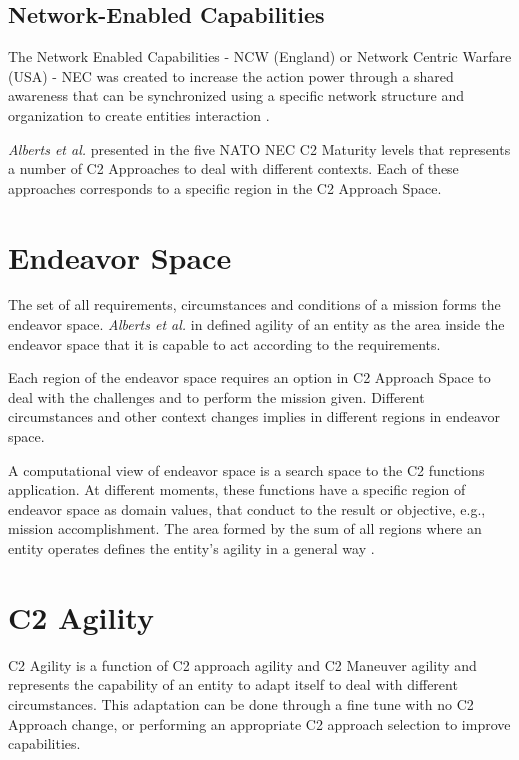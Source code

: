\subsection {Network-Enabled Capabilities}

The Network Enabled Capabilities - NCW (England) or Network Centric Warfare (USA) - NEC was created to increase the action power through a shared awareness that can be synchronized using a specific network structure and organization to create entities interaction \cite{Alberts2000}. 

\textit{Alberts et al.} presented in \cite{nato01} the five NATO NEC C2 Maturity levels that represents a number of C2 Approaches to deal with different contexts. Each of these approaches corresponds to a specific region in the C2 Approach Space.




\section{Endeavor Space}

The set of all requirements, circumstances and conditions of a mission forms the endeavor space. \textit{Alberts et al.} in  \cite{Alberts2011} defined agility of an entity as the area inside the endeavor space that it is capable to act according to the requirements.

Each region of the endeavor space requires an option in C2 Approach Space to deal with the challenges and to perform the mission given. Different circumstances and other context changes implies in different regions in endeavor space.

A computational view of endeavor space is a search space to the C2 functions application. At different moments, these functions have a specific region of endeavor space as domain values, that conduct to the result or objective, e.g., mission accomplishment. The area formed by the sum of all regions where an entity operates defines the entity's agility in a general way \cite{Alberts2011}.




\section {C2 Agility}

C2 Agility is a function of C2 approach agility and C2 Maneuver agility and represents the capability of an entity to adapt itself to deal with different circumstances. This adaptation can be done through a fine tune with no C2 Approach change, or performing an appropriate C2 approach selection to improve capabilities.

